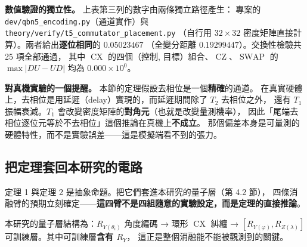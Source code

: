 \documentclass[11pt,a4paper]{ctexart}
\begin{document}
\begin{table}[t]
\centering
\caption{實測與定理一致。前兩列與第三列相差 15
個數量級------這正是「定理保證的零」與「真實物理效應」的差別。}
\end{table}


\textbf{數值驗證的獨立性。} 上表第三列的數字由兩條獨立路徑產生： 專案的
\texttt{dev/\allowbreak qbn5\_\allowbreak encoding.py}（通道實作）與
\texttt{theory/\allowbreak verify/\allowbreak t5\_\allowbreak commutator\_\allowbreak placement.py} （自行用
\(32 \times 32\) 密度矩陣直接計算）。兩者給出\textbf{逐位相同}的
\(0.05023467\) （全變分距離 \(0.19299447\)）。交換性檢驗共 25
項全部通過， 其中 \(\operatorname{CX}\) 的四個（控制,
目標）組合、\(\operatorname{CZ}\)、\(\operatorname{SWAP}\) 的
\(\max|DU - UD|\) 均為 \(0.000 \times 10^{0}\)。

\textbf{對真機實驗的一個提醒。}
本節的定理假設去相位是一個\textbf{精確}的通道。
在真實硬體上，去相位是用延遲（delay）實現的，而延遲期間除了 \(T_{2}\)
去相位之外， 還有 \(T_{1}\) 振幅衰減。\(T_{1}\)
會改變密度矩陣的\textbf{對角元}（也就是改變量測機率），
因此「尾端去相位逐位元等於不去相位」這個推論在真機上\textbf{不成立}。
那個偏差本身是可量測的硬體特性，而不是實驗誤差------這是模擬端看不到的張力。

\subsection{把定理套回本研究的電路}

定理 1 與定理 2 是抽象命題。把它們套進本研究的量子層（第 4.2 節），
四條消融臂的預期立刻確定------\textbf{這四臂不是四組隨意的實驗設定，而是定理的直接推論}。

本研究的量子層結構為：\(R_{Y\left( \theta_{i} \right)}\) 角度編碼 → 環形
\(\operatorname{CX}\) 糾纏 →
\(\left\lbrack R_{Y(\varphi)},R_{Z(\lambda)} \right\rbrack\)
可訓練層。其中可訓練層\textbf{含有 \(R_{Y}\)}，
這正是整個消融能不能被觀測到的關鍵。
\end{document}
